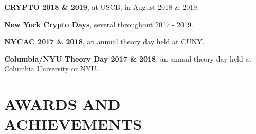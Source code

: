 \documentclass[margin]{res}
\begin{document}
\begin{resume}
\textbf{CRYPTO 2018 \& 2019},  at USCB, in August 2018 \& 2019.

\textbf{New York Crypto Days}, several throughout 2017 - 2019.

\textbf{NYCAC 2017 \& 2018}, an annual theory day held at CUNY.

\textbf{Columbia/NYU Theory Day 2017 \& 2018}, an annual theory day held at Columbia University or NYU.


\fi



\iffalse

\section{PAST PROJECTS}

\employer{Prof. Ramesh Hariharan }
\location{Indian Institute of Science}
\dates{June 2014}
\title{\textbf{Satistfaction Of Boolean String Populations Recurrently Generated By an Underlying Boolean Function}}
\begin{position}
This project aimed to build upon a paper by Papadimitrou et al. which modelled sexual reproduction, by using a Boolean function to model the action of natural selection. We obtained positive results for some specific cases.
\end{position}

\employer{Prof. Bhavana Kanukurthi and Prof. Himanshu Tyagi }
\location{Indian Institute of Science}
\dates{Thesis Project (April 2016)}
\title{\textbf{Information Theoretic Secure Computation}}
\begin{position}
 Information theoretic proofs have been known for the fact that only a very trivial class of functions are securely computable, given no additional common resources to the parties. We looked at the problem of what other classes of functions become securely computable given additional common resources to parties.
\end{position}

\fi


\section{AWARDS AND ACHIEVEMENTS}


\end{resume}
\end{document}

